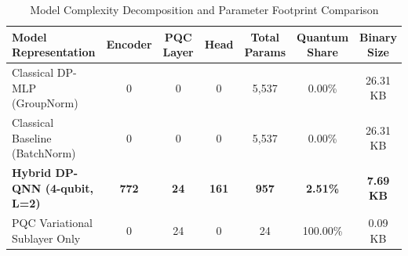 \begin{table}[t]
\centering
\caption{Model Complexity Decomposition and Parameter Footprint Comparison}
\label{tab:model_complexity}
\begin{tabular}{lcccccc}
\hline
\textbf{Model Representation} & \textbf{Encoder} & \textbf{PQC Layer} & \textbf{Head} & \textbf{Total Params} & \textbf{Quantum Share} & \textbf{Binary Size} \\
\hline
Classical DP-MLP (GroupNorm) & 0 & 0 & 0 & 5,537 & 0.00\% & 26.31 KB \\
Classical Baseline (BatchNorm) & 0 & 0 & 0 & 5,537 & 0.00\% & 26.31 KB \\
\textbf{Hybrid DP-QNN (4-qubit, L=2)} & \textbf{772} & \textbf{24} & \textbf{161} & \textbf{957} & \textbf{2.51\%} & \textbf{7.69 KB} \\
PQC Variational Sublayer Only & 0 & 24 & 0 & 24 & 100.00\% & 0.09 KB \\
\hline
\end{tabular}
\end{table}
